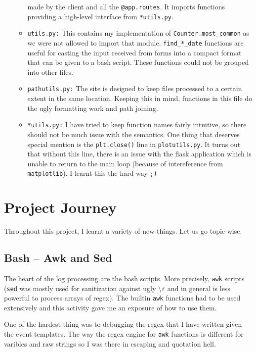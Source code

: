\documentclass[11pt]{scrartcl}
\begin{document}
\begin{itemize}
\begin{itemize}
        made by the client and all the \texttt{@app.routes}. It imports
        functions providing a high-level interface from \texttt{*utils.py}.
      \item \texttt{utils.py:} This contains my implementation of
        \texttt{Counter.most\_common} as we were not allowed to import that
        module. \texttt{find\_*\_date} functions are useful for casting the
        input received from forms into a compact format that can be given to a
        bash script. These functions could not be grouped into other files.
      \item \texttt{pathutils.py:} The site is designed to keep files processed
        to a certain extent in the same location. Keeping this in mind,
        functions in this file do the ugly formatting work and path joining.
      \item \texttt{*utils.py:} I have tried to keep function names fairly
        intuitive, so there should not be much issue with the semantics. One
        thing that deserves special mention is the \texttt{plt.close()} line in
        \texttt{plotutils.py}. It turns out that without this line, there is an
        issue with the flask application which is unable to return to the main
        loop (because of intereference from \texttt{matplotlib}). I learnt this
        the hard way \texttt{;)}

    \end{itemize}
\end{itemize}

\newpage

\section{Project Journey}
Throughout this project, I learnt a variety of new things. Let us go topic-wise.

\subsection{Bash -- Awk and Sed}

The heart of the log processing are the bash scripts. More precisely,
\texttt{awk} scripts (\texttt{sed} was mostly used for sanitization against ugly
\textbackslash\texttt{r} and in general is less powerful to process arrays of regex).
The builtin \texttt{awk} functions had to be used extensively and this activity
gave me an exposure of how to use them. 

One of the hardest thing was to
debugging the regex that I have written given the event templates. The way the
regex engine for \texttt{awk} functions is different for varibles and raw
strings so I was there in escaping and quotation hell. 
\end{document}
